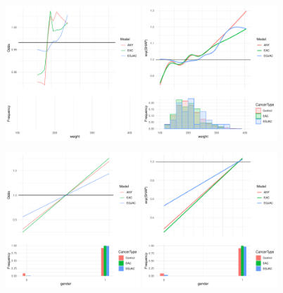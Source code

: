 \documentclass[12pt]{article}
\begin{document}
\begin{figure}[h]
\centering
\includegraphics[width=0.45\textwidth]{pdp/weight.pdf}
\includegraphics[width=0.45\textwidth]{shap/weight.pdf}
\end{figure}
\begin{figure}[h]
\centering
\includegraphics[width=0.45\textwidth]{pdp/gender.pdf}
\includegraphics[width=0.45\textwidth]{shap/gender.pdf}
\end{figure}
\end{document}
